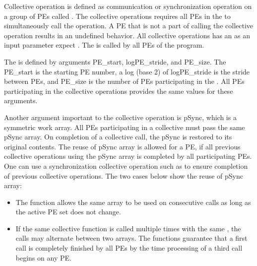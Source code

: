 
Collective operation is defined as communication or synchronization operation 
on a group of \ac{PE}s called \activeset{}. The collective operations requires all
\ac{PE}s in the \activeset{} to simultaneously call the operation. 
A \ac{PE} that is not a part of \activeset{} calling the collective 
operation results in an undefined behavior. All
collective operations has an \activeset{} as an input parameter expect
\barrierall{}. The \barrierall{} is called by all \ac{PE}s of the \openshmem{}
program. 

The \activeset{} is defined by arguments PE\_start, logPE\_stride, 
and PE\_size. The PE\_start is the starting \ac{PE} number, a log (base 2) of logPE\_stride 
is the stride between \ac{PE}s, and PE\_size is the number of \ac{PE}s 
participating in the \activeset{}. All \ac{PE}s participating in the 
collective operations provides the same values for these arguments. 
 
Another argument important to the collective operation is pSync, which is a symmetric work 
array. All \ac{PE}s participating in a collective must pass the same
pSync array. On completion of a collective call, the pSync is restored to its 
original contents. The reuse of pSync array is allowed for a \ac{PE}, if all previous collective 
operations using the pSync array is completed by all participating 
\ac{PE}s. One can use a synchronization collective operation such as \barrier{}
to ensure completion of previous collective operations. The two cases below
show the reuse of pSync array:

\begin{itemize}
\item The  function allows the same  array to be used
          on consecutive calls as long as the active \ac{PE} set does not change.
\item  If the same collective function is called multiple times with the
          same \activeset, the calls may alternate between two  arrays.
          The \openshmem functions guarantee that a first call is completely finished by 
          all \ac{PE}s by the time processing of a third  call  begins  on
          any \ac{PE}.          
\end{itemize}


